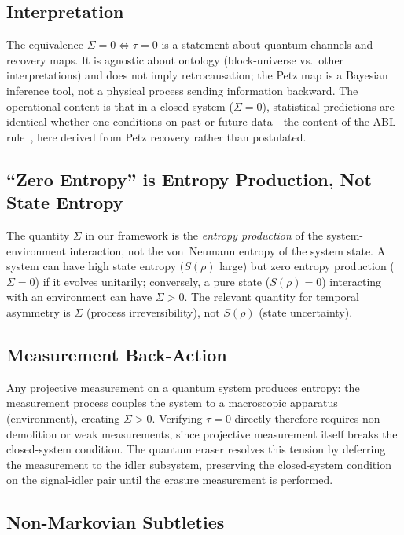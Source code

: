 \documentclass[prl,twocolumn,superscriptaddress,longbibliography]{revtex4-2}
\newcommand{\tauasym}{\tau}
\begin{document}
\subsection{Interpretation}

The equivalence $\Sigma = 0 \Leftrightarrow \tauasym = 0$ is a
statement about quantum channels and recovery maps. It is agnostic
about ontology (block-universe vs.\ other interpretations) and does
not imply retrocausation; the Petz map is a Bayesian inference tool,
not a physical process sending information backward.
The operational content is that in a closed system ($\Sigma = 0$),
statistical predictions are identical whether one conditions on
past or future data---the content of the ABL
rule~\cite{ABL1964}, here derived from Petz recovery rather
than postulated.

\subsection{``Zero Entropy'' is Entropy Production, Not State Entropy}

The quantity $\Sigma$ in our framework is the \emph{entropy
production} of the system-environment interaction, not the von~Neumann
entropy of the system state.
A system can have high state entropy ($S(\rho)$ large) but
zero entropy production ($\Sigma = 0$) if it evolves unitarily;
conversely, a pure state ($S(\rho) = 0$) interacting with an
environment can have $\Sigma > 0$.
The relevant quantity for temporal asymmetry is $\Sigma$
(process irreversibility), not $S(\rho)$ (state uncertainty).

\subsection{Measurement Back-Action}

Any projective measurement on a quantum system produces entropy:
the measurement process couples the system to a macroscopic
apparatus (environment), creating $\Sigma > 0$.
Verifying $\tauasym = 0$ directly therefore requires non-demolition or
weak measurements, since projective measurement itself breaks the
closed-system condition.
The quantum eraser resolves this tension by deferring the
measurement to the idler subsystem, preserving the closed-system
condition on the signal-idler pair until the erasure measurement
is performed.

\subsection{Non-Markovian Subtleties}
\end{document}
